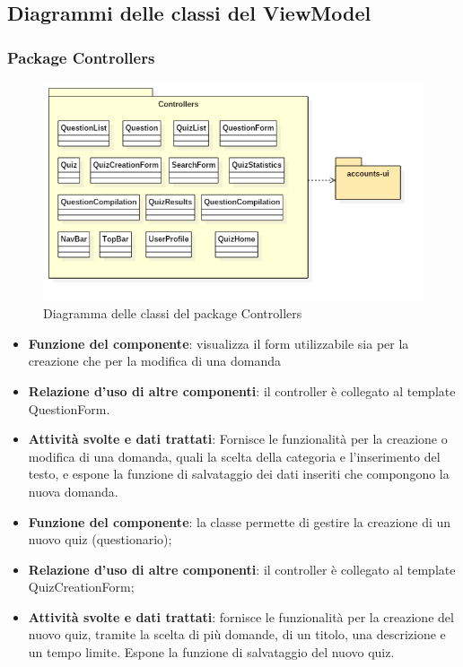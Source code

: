 \subsection{Diagrammi delle classi del ViewModel}
\subsubsection{Package Controllers}
\begin{figure}[h!]
	\begin{center}
		\includegraphics[scale=0.6]{../images/ControllersClass.png}
		\caption{Diagramma delle classi del package Controllers}
	\end{center}
\end{figure}


\begin{itemize}
	\item\textbf{Funzione del componente}: visualizza il form utilizzabile sia per la creazione che per la modifica di una domanda
	\item\textbf{Relazione d'uso di altre componenti}: il controller è collegato al template QuestionForm.
	\item\textbf{Attività svolte e dati trattati}: Fornisce le funzionalità per la creazione o modifica di una domanda, quali la scelta della categoria e l'inserimento del testo, e espone la funzione di salvataggio dei dati inseriti che compongono la nuova domanda.
\end{itemize}


\begin{itemize}
	\item\textbf{Funzione del componente}: la classe permette di gestire la creazione di un nuovo quiz (questionario); 
	\item\textbf{Relazione d'uso di altre componenti}: il controller è collegato al template QuizCreationForm;
	\item\textbf{Attività svolte e dati trattati}: fornisce le funzionalità per la creazione del nuovo quiz, tramite la scelta di più domande, di un titolo, una descrizione e un tempo limite. Espone la funzione di salvataggio del nuovo quiz.
\end{itemize}

